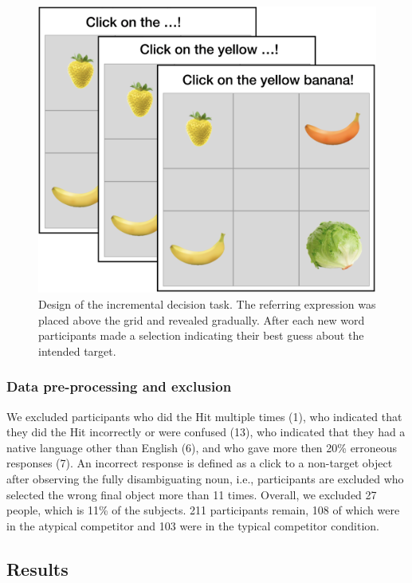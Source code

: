 \documentclass[a4paper,man,floatsintext,natbib]{apa6}
\begin{document}
\begin{figure}
	\begin{center}
		\includegraphics[width=.5\textwidth]{img/comprehension/IDT-design.pdf}
	\end{center}
\caption{Design of the incremental decision task. The referring expression was placed above the grid and revealed gradually. After each new word participants made a selection indicating their best guess about the intended target.} 
\label{IDT-design}
\end{figure}


\subsubsection{Data pre-processing and exclusion}

We excluded participants who did the Hit multiple times (1), who indicated that they did the Hit incorrectly or were confused (13), who indicated that they had a native language other than English (6), and who gave more then 20\% erroneous responses (7). An incorrect response is defined as a click to a non-target object after observing the fully disambiguating noun, i.e., participants are excluded who selected the wrong final object more than 11 times. Overall, we excluded 27 people, which is 11\% of the subjects. 211 participants remain, 108 of which were in the atypical competitor and 103 were in the typical competitor condition. 

\subsection{Results}
\end{document}
